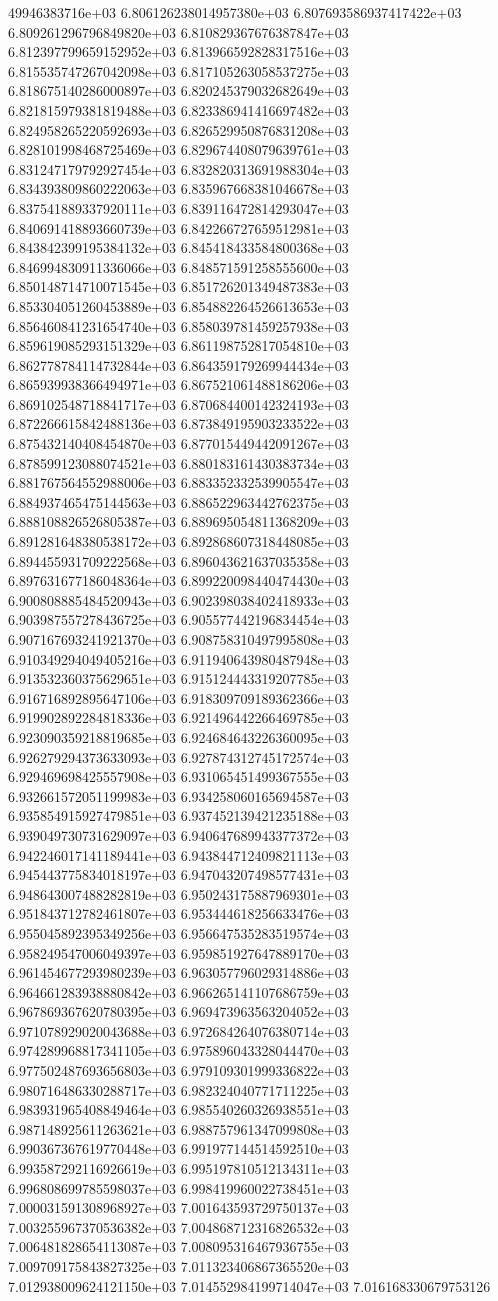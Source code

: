 49946383716e+03	6.806126238014957380e+03	6.807693586937417422e+03	6.809261296796849820e+03	6.810829367676387847e+03	6.812397799659152952e+03	6.813966592828317516e+03	6.815535747267042098e+03	6.817105263058537275e+03	6.818675140286000897e+03	6.820245379032682649e+03	6.821815979381819488e+03	6.823386941416697482e+03	6.824958265220592693e+03	6.826529950876831208e+03	6.828101998468725469e+03	6.829674408079639761e+03	6.831247179792927454e+03	6.832820313691988304e+03	6.834393809860222063e+03	6.835967668381046678e+03	6.837541889337920111e+03	6.839116472814293047e+03	6.840691418893660739e+03	6.842266727659512981e+03	6.843842399195384132e+03	6.845418433584800368e+03	6.846994830911336066e+03	6.848571591258555600e+03	6.850148714710071545e+03	6.851726201349487383e+03	6.853304051260453889e+03	6.854882264526613653e+03	6.856460841231654740e+03	6.858039781459257938e+03	6.859619085293151329e+03	6.861198752817054810e+03	6.862778784114732844e+03	6.864359179269944434e+03	6.865939938366494971e+03	6.867521061488186206e+03	6.869102548718841717e+03	6.870684400142324193e+03	6.872266615842488136e+03	6.873849195903233522e+03	6.875432140408454870e+03	6.877015449442091267e+03	6.878599123088074521e+03	6.880183161430383734e+03	6.881767564552988006e+03	6.883352332539905547e+03	6.884937465475144563e+03	6.886522963442762375e+03	6.888108826526805387e+03	6.889695054811368209e+03	6.891281648380538172e+03	6.892868607318448085e+03	6.894455931709222568e+03	6.896043621637035358e+03	6.897631677186048364e+03	6.899220098440474430e+03	6.900808885484520943e+03	6.902398038402418933e+03	6.903987557278436725e+03	6.905577442196834454e+03	6.907167693241921370e+03	6.908758310497995808e+03	6.910349294049405216e+03	6.911940643980487948e+03	6.913532360375629651e+03	6.915124443319207785e+03	6.916716892895647106e+03	6.918309709189362366e+03	6.919902892284818336e+03	6.921496442266469785e+03	6.923090359218819685e+03	6.924684643226360095e+03	6.926279294373633093e+03	6.927874312745172574e+03	6.929469698425557908e+03	6.931065451499367555e+03	6.932661572051199983e+03	6.934258060165694587e+03	6.935854915927479851e+03	6.937452139421235188e+03	6.939049730731629097e+03	6.940647689943377372e+03	6.942246017141189441e+03	6.943844712409821113e+03	6.945443775834018197e+03	6.947043207498577431e+03	6.948643007488282819e+03	6.950243175887969301e+03	6.951843712782461807e+03	6.953444618256633476e+03	6.955045892395349256e+03	6.956647535283519574e+03	6.958249547006049397e+03	6.959851927647889170e+03	6.961454677293980239e+03	6.963057796029314886e+03	6.964661283938880842e+03	6.966265141107686759e+03	6.967869367620780395e+03	6.969473963563204052e+03	6.971078929020043688e+03	6.972684264076380714e+03	6.974289968817341105e+03	6.975896043328044470e+03	6.977502487693656803e+03	6.979109301999336822e+03	6.980716486330288717e+03	6.982324040771711225e+03	6.983931965408849464e+03	6.985540260326938551e+03	6.987148925611263621e+03	6.988757961347099808e+03	6.990367367619770448e+03	6.991977144514592510e+03	6.993587292116926619e+03	6.995197810512134311e+03	6.996808699785598037e+03	6.998419960022738451e+03	7.000031591308968927e+03	7.001643593729750137e+03	7.003255967370536382e+03	7.004868712316826532e+03	7.006481828654113087e+03	7.008095316467936755e+03	7.009709175843827325e+03	7.011323406867365520e+03	7.012938009624121150e+03	7.014552984199714047e+03	7.016168330679753126